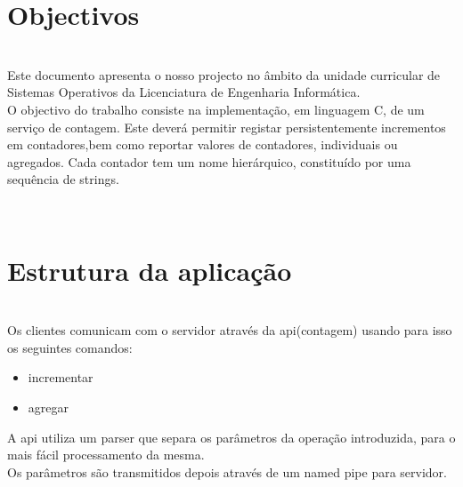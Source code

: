 \documentclass[10pt,notitlepage]{article}
\begin{document}
\tableofcontents

\newpage

\section{Objectivos}
~\\
Este documento apresenta o nosso projecto no âmbito da unidade curricular de Sistemas Operativos da Licenciatura de Engenharia Informática.\\
O objectivo do trabalho consiste na implementação, em linguagem C, de um serviço de contagem. Este deverá permitir registar persistentemente incrementos em contadores,bem como reportar valores de contadores, individuais ou agregados. Cada contador tem um nome hierárquico, constituído por uma sequência de strings.

~\\
\section{Estrutura da aplicação}
~\\
Os clientes comunicam com o servidor através da api(contagem) usando para isso os seguintes comandos:
\begin{itemize}
\item incrementar
\item agregar
\end{itemize}

A api utiliza um parser que separa os parâmetros da operação introduzida, para o mais fácil
processamento da mesma.\\
Os parâmetros são transmitidos depois através de um named pipe para servidor.
\end{document}
